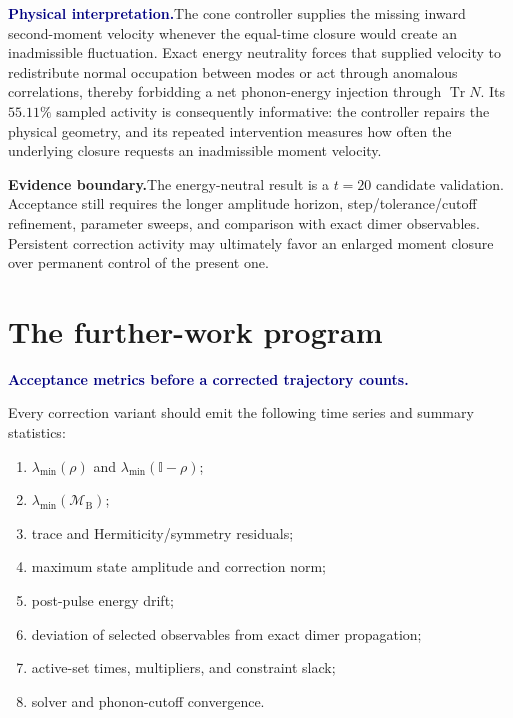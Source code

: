 \documentclass[10pt]{article}
\newcommand{\Tr}{\operatorname{Tr}}
\newcommand{\I}{\mathbb I}
\newcommand{\MB}{\mathcal M_{\mathrm B}}
\newcommand{\pedbox}[2]{%
  \par\medskip
  \noindent\colorbox{pale}{%
    \parbox{\dimexpr\linewidth-2\fboxsep\relax}{%
      \textcolor{navy}{\textbf{#1}}\quad #2%
    }%
  }\par\medskip
}
\newcommand{\physicalbox}[1]{\pedbox{Physical interpretation.}{#1}}
\newcommand{\warningbox}[1]{%
  \par\medskip
  \noindent\colorbox{palered}{%
    \parbox{\dimexpr\linewidth-2\fboxsep\relax}{%
      \textcolor{brick}{\textbf{Evidence boundary.}}\quad #1%
    }%
  }\par\medskip
}
\newcommand{\flowlead}[1]{%
  \par\medskip
  \needspace{3\baselineskip}%
  \noindent\textcolor{navy}{\textbf{#1.}}\enspace\ignorespaces
}
\begin{document}
\physicalbox{The cone controller supplies the missing inward second-moment
velocity whenever the equal-time closure would create an inadmissible
fluctuation.  Exact energy neutrality forces that supplied velocity to
redistribute normal occupation between modes or act through anomalous
correlations, thereby forbidding a net phonon-energy injection through
\(\Tr N\).  Its \(55.11\%\) sampled activity is consequently informative: the
controller repairs the physical geometry, and its repeated intervention
measures how often the underlying closure requests an inadmissible moment
velocity.}

\warningbox{The energy-neutral result is a \(t=20\) candidate validation.
Acceptance still requires the longer amplitude horizon, step/tolerance/cutoff
refinement, parameter sweeps, and comparison with exact dimer observables.
Persistent correction activity may ultimately favor an enlarged moment
closure over permanent control of the present one.}

\part{The further-work program}

\flowlead{Acceptance metrics before a corrected trajectory counts}

Every correction variant should emit the following time series and summary
statistics:
\begin{enumerate}
  \item \(\lambda_{\min}(\rho)\) and
  \(\lambda_{\min}(\I-\rho)\);
  \item \(\lambda_{\min}(\MB)\);
  \item trace and Hermiticity/symmetry residuals;
  \item maximum state amplitude and correction norm;
  \item post-pulse energy drift;
  \item deviation of selected observables from exact dimer propagation;
  \item active-set times, multipliers, and constraint slack;
  \item solver and phonon-cutoff convergence.
\end{enumerate}
\end{document}
